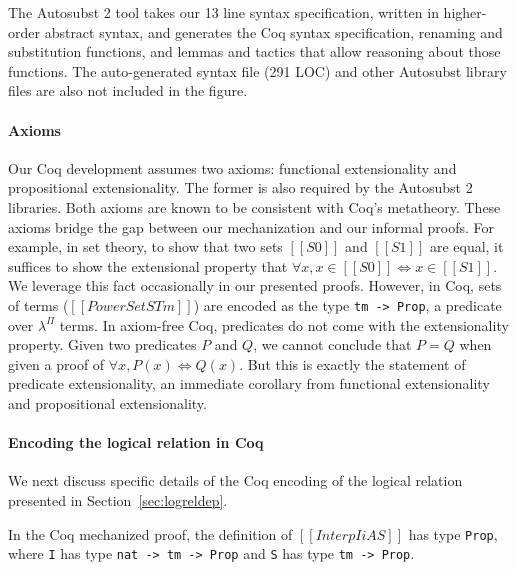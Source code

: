 \documentclass[\ifpublic nolinenum\else\fi,online,OA]{jfp}
\newcommand{\lang}{$\lambda^{\Pi}$\xspace}
\theoremstyle{definition}
\begin{document}
The Autosubst 2 tool takes our 13 line syntax specification, written in
higher-order abstract syntax, and generates the Coq syntax specification,
renaming and substitution functions, and lemmas and tactics that allow
reasoning about those functions. The auto-generated syntax file (291 LOC)
and other Autosubst library files are also not included in the figure.

\paragraph{Axioms}
Our Coq development assumes two axioms: functional extensionality
and propositional extensionality. The former is also required by
the Autosubst 2 libraries. Both axioms are known to be consistent
with Coq's metatheory.
%
These axioms bridge the gap between our mechanization and our informal
proofs. For example, in set theory, to show that two sets $[[S0]]$ and
$[[S1]]$ are equal, it suffices to show the extensional property that
$\forall x, x \in [[S0]] \iff x \in [[S1]]$. We leverage this fact
occasionally in our presented proofs.
%
However, in Coq, sets of terms ($[[PowerSet STm]]$) are encoded as the 
type \texttt{tm
  -> Prop}, a predicate over \lang{} terms.  In axiom-free Coq, predicates do
not come with the extensionality property. Given two predicates $P$ and $Q$,
we cannot conclude that $P = Q$ when given a proof of
$\forall x, P(x) \iff Q(x)$. But this is exactly the statement of 
predicate extensionality, an immediate corollary from functional
extensionality and propositional extensionality.

\paragraph{Encoding the logical relation in Coq}
We next discuss specific details of the Coq encoding of the logical relation
presented in Section~\ref{sec:logreldep}.

In the Coq mechanized proof, %
the definition of $[[Interp I i A S]]$ has type
\texttt{Prop}, where \texttt{I} has type \texttt{nat -> tm -> Prop} and \texttt{S} has type \texttt {tm -> Prop}.
\end{document}
